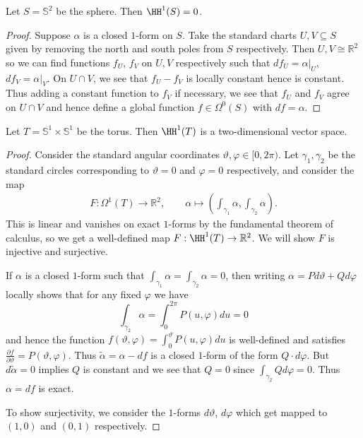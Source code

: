 \begin{proposition}
    Let \(S=\mathbb{S}^2\) be the sphere. Then \(\HH^1(S)=0\).
    \begin{proof}
        Suppose \(\alpha\) is a closed \(1\)-form on \(S\). Take the standard
        charts \(U,V\subseteq S\) given by removing the north and south
        poles from \(S\) respectively. Then \(U,V\cong \mathbb{R}^2\) so we can
        find functions \(f_U\), \(f_V\) on \(U,V\) respectively such that
        \(df_U=\alpha|_U\), \(df_V=\alpha|_V\). On \(U\cap V\), we see that
        \(f_U-f_V\) is locally constant hence is constant. Thus adding a
        constant function to \(f_V\) if necessary, we see that \(f_U\)
        and \(f_V\) agree on \(U\cap V\) and hence define a global
        function \(f\in \Omega^0(S)\) with \(df=\alpha\).
    \end{proof}
\end{proposition}

\begin{proposition}
    Let \(T=\mathbb{S}^1\times \mathbb{S}^1\) be the torus. Then \(\HH^1(T)\) is
    a two-dimensional vector space.

    \begin{proof}
        Consider the standard angular coordinates \(\vartheta, \varphi\in
        [0,2\pi)\). Let \(\gamma_1,\gamma_2\) be the standard circles
        corresponding to \(\vartheta=0\) and \(\varphi=0\) respectively, and
        consider the map
        \begin{align*}
            F:\Omega^1(T)\to \mathbb{R}^2, \qquad
                \alpha\mapsto \left(\int_{\gamma_1}\alpha,
                \int_{\gamma_2}\alpha\right).
        \end{align*}
        This is linear and vanishes on exact \(1\)-forms by the fundamental
        theorem of calculus, so we get a well-defined map \(F:\HH^1(T)\to
        \mathbb{R}^2\). We will show \(F\) is injective and surjective.

        If \(\alpha\) is a closed \(1\)-form such that
        \(\int_{\gamma_1}\alpha=\int_{\gamma_2}\alpha = 0\), then writing
        \(\alpha=Pd\vartheta + Qd\varphi\) locally shows that for any fixed
        \(\varphi\) we have
        \[
            \int_{\gamma_2}\alpha = \int_0^{2\pi} P(u,
            \varphi)du = 0
        \]
        and hence the function \(f(\vartheta, \varphi)=\int_0^\vartheta
        P(u,\varphi)du\) is well-defined and satisfies \(\frac{\partial
        f}{\partial \vartheta}=P(\vartheta,\varphi)\). Thus
        \(\tilde{\alpha}=\alpha-df\) is a closed \(1\)-form of the form
        \(Q\cdot d\varphi\). But \(d\tilde\alpha=0\) implies \(Q\) is
        constant and we see that \(Q=0\) since  \(\int_{\gamma_2}Qd\varphi=0\).
        Thus \(\alpha=df\) is exact.

        To show surjectivity, we consider the \(1\)-forms \(d\vartheta\),
        \(d\varphi\) which get mapped to \((1,0)\) and \((0,1)\)
        respectively.
    \end{proof}
\end{proposition}

